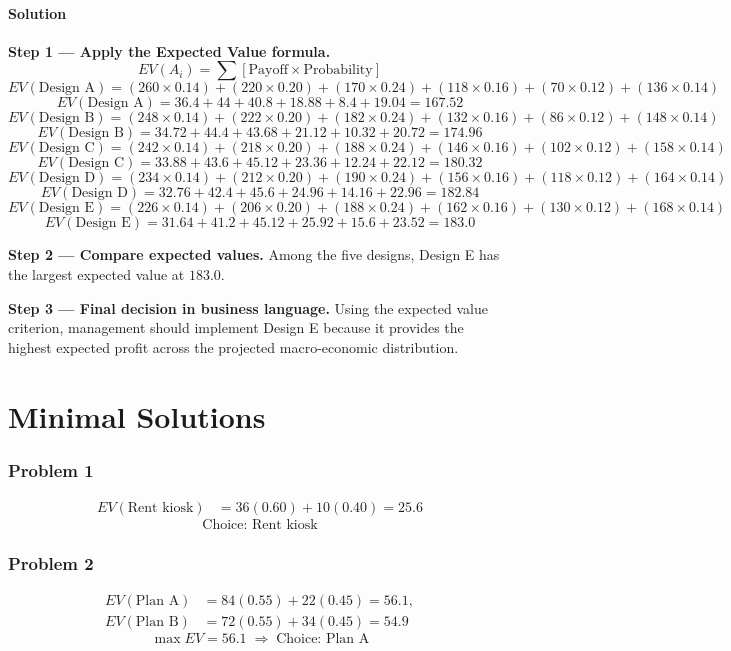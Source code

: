\begin{ExamProblems}
		\subsection*{Solution}
		\textbf{Step 1 --- Apply the Expected Value formula.}
		\[
		EV(A_i)=\sum [\text{Payoff}\times\text{Probability}]
		\]
		\[
		EV(\text{Design A})=(260\times0.14)+(220\times0.20)+(170\times0.24)+(118\times0.16)+(70\times0.12)+(136\times0.14)
		\]
		\[
		EV(\text{Design A})=36.4+44+40.8+18.88+8.4+19.04=167.52
		\]
		\[
		EV(\text{Design B})=(248\times0.14)+(222\times0.20)+(182\times0.24)+(132\times0.16)+(86\times0.12)+(148\times0.14)
		\]
		\[
		EV(\text{Design B})=34.72+44.4+43.68+21.12+10.32+20.72=174.96
		\]
		\[
		EV(\text{Design C})=(242\times0.14)+(218\times0.20)+(188\times0.24)+(146\times0.16)+(102\times0.12)+(158\times0.14)
		\]
		\[
		EV(\text{Design C})=33.88+43.6+45.12+23.36+12.24+22.12=180.32
		\]
		\[
		EV(\text{Design D})=(234\times0.14)+(212\times0.20)+(190\times0.24)+(156\times0.16)+(118\times0.12)+(164\times0.14)
		\]
		\[
		EV(\text{Design D})=32.76+42.4+45.6+24.96+14.16+22.96=182.84
		\]
		\[
		EV(\text{Design E})=(226\times0.14)+(206\times0.20)+(188\times0.24)+(162\times0.16)+(130\times0.12)+(168\times0.14)
		\]
		\[
		EV(\text{Design E})=31.64+41.2+45.12+25.92+15.6+23.52=183.0
		\]
		
		\textbf{Step 2 --- Compare expected values.}
		Among the five designs, Design E has the largest expected value at $183.0$.
		
		\textbf{Step 3 --- Final decision in business language.}
		Using the expected value criterion, management should implement Design E because it provides the highest expected profit across the projected macro-economic distribution.
		\end{ExamProblems}

	\part{Minimal Solutions}
	\section*{Problem 1}
	\[
	\begin{aligned}
	EV(\text{Rent kiosk}) &= 36(0.60)+10(0.40)=25.6
	\end{aligned}
	\]
	\[
	\text{Choice: Rent kiosk}
	\]

	\section*{Problem 2}
	\[
	\begin{aligned}
	EV(\text{Plan A}) &= 84(0.55)+22(0.45)=56.1,\\
	EV(\text{Plan B}) &= 72(0.55)+34(0.45)=54.9
	\end{aligned}
	\]
	\[
	\max EV = 56.1 \;\Rightarrow\; \text{Choice: Plan A}
	\]

